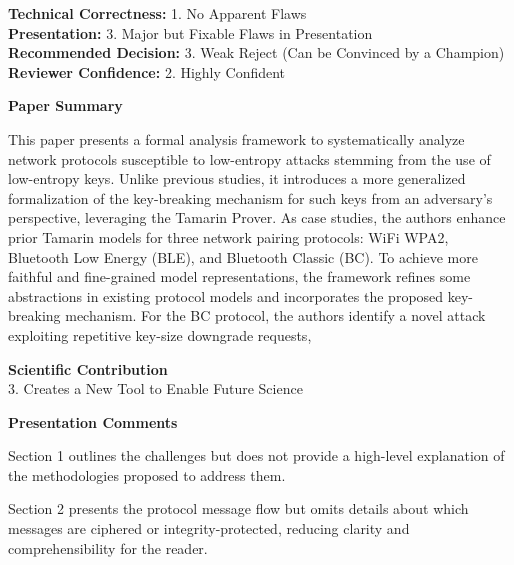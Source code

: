 \documentclass{article}
\newcommand{\response}[1]{\textcolor{red}{\{#1\}}}
\begin{document}
\noindent\textbf{Technical Correctness:} 1. No Apparent Flaws\\
\textbf{Presentation:} 3. Major but Fixable Flaws in Presentation\\
\textbf{Recommended Decision:} 3. Weak Reject (Can be Convinced by a Champion)\\
\textbf{Reviewer Confidence:} 2. Highly Confident

\rule{0pt}{8pt}

\noindent\textbf{Paper Summary}

This paper presents a formal analysis framework to systematically analyze network protocols susceptible to low-entropy attacks stemming from the use of low-entropy keys. 
Unlike previous studies, it introduces a more generalized formalization of the key-breaking mechanism for such keys from an adversary's perspective, leveraging the Tamarin Prover. 
As case studies, the authors enhance prior Tamarin models for three network pairing protocols: WiFi WPA2, Bluetooth Low Energy (BLE), and Bluetooth Classic (BC). 
To achieve more faithful and fine-grained model representations, the framework refines some abstractions in existing protocol models and incorporates the proposed key-breaking mechanism. 
For the BC protocol, the authors identify a novel attack exploiting repetitive key-size downgrade requests,  

\rule{0pt}{8pt}

\noindent\textbf{Scientific Contribution}\\
3. Creates a New Tool to Enable Future Science

\rule{0pt}{8pt}

\noindent\textbf{Presentation Comments}

Section 1 outlines the challenges but does not provide a high-level explanation of the methodologies proposed to address them.

Section 2 presents the protocol message flow but omits details about which messages are ciphered or integrity-protected, reducing clarity and comprehensibility for the reader.
\end{document}
